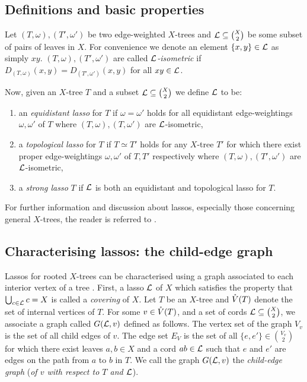 \subsection{Definitions and basic properties}
\label{sec:defin-basic-prop}

Let $(T,\omega), (T',\omega')$ be two edge-weighted $X$-trees and ${\mathcal L}
\subseteq {X \choose 2}$ be some subset of pairs of leaves in $X$.  For
convenience we denote an element $\{x,y\} \in {\mathcal L}$ as simply $xy$.
$(T,\omega), (T',\omega')$ are called \textit{${\mathcal L}$-isometric} if
$D_{(T,\omega)}(x,y) = D_{(T',\omega')}(x,y)$ for all $xy \in {\mathcal L}$.

Now, given an $X$-tree $T$ and a subset ${\mathcal L} \subseteq {X \choose 2}$ we
define ${\mathcal L}$ to be:
\begin{enumerate}[label=(\roman*)]
\item an \textit{equidistant lasso} for $T$ if $\omega = \omega'$ holds for
  all equidistant edge-weightings $\omega,\omega'$ of $T$ where
  $(T,\omega),(T,\omega')$ are ${\mathcal L}$-isometric,
\item a \textit{topological lasso} for $T$ if $T \simeq T'$ holds for any
  $X$-tree $T'$ for which there exist proper edge-weightings $\omega,\omega'$
  of $T,T'$ respectively where $(T,\omega),(T',\omega')$ are ${\mathcal L}$-isometric,
\item a \textit{strong lasso} $T$ if ${\mathcal L}$ is both an equidistant and
  topological lasso for $T$.
\end{enumerate}

For further information and discussion about lassos, especially those
concerning general $X$-trees, the reader is referred to \citep{DHS11}.

\subsection{Characterising lassos: the child-edge graph}
\label{sec:lassoing-rooted-x}

Lassos for rooted $X$-trees can be characterised using a graph associated to
each interior vertex of a tree \citep{HP13}.  First, a lasso ${\mathcal L}$ of $X$
which satisfies the property that $\bigcup_{c \in {\mathcal L}} c = X$ is called a
\textit{covering} of $X$.  Let $T$ be an $X$-tree and $\mathring{V}(T)$ denote the set
of internal vertices of $T$.  For some $v \in \mathring{V}(T)$, and a set of cords ${\mathcal L}
\subseteq {X \choose 2}$, we associate a graph called $G({\mathcal L},v)$ defined as
follows.  The vertex set of the graph $V_v$ is the set of all child edges of
$v$.  The edge set $E_V$ is the set of all $\{e,e'\} \in {V_v \choose 2}$ for
which there exist leaves $a,b \in X$ and a cord $ab \in {\mathcal L}$ such that $e$ and
$e'$ are edges on the path from $a$ to $b$ in $T$.  We call the graph
$G({\mathcal L},v)$ the \textit{child-edge graph} (\textit{of $v$ with respect to $T$
  and ${\mathcal L}$}).

